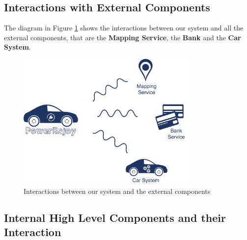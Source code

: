 \subsection{Interactions with External Components} \label{subsec:comp-extern}
The diagram in Figure \ref{fig:connection} shows the interactions between our system and all the external components, that are the \textbf{Mapping Service}, the \textbf{Bank} and the \textbf{Car System}.

\begin{figure}[htbp]
\centering
\includegraphics[width=0.8\textwidth]{Images/Connection}
\caption{Interactions between our system and the external components}
\label{fig:connection}
\end{figure}
\clearpage

\clearpage

\subsection{Internal High Level Components and their Interaction} \label{subsec:comp-inter}

